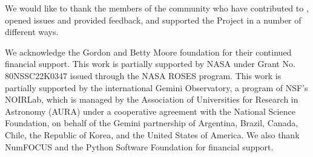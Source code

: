 \documentclass[modern]{aastex631}
\begin{document}
\vspace{2em}

We would like to thank the members of the community who have contributed to
\astropy, opened issues and provided feedback, and supported the
Project in a number of different ways.

We acknowledge the Gordon and Betty Moore foundation for their continued
financial support.
This work is partially supported by NASA under Grant No. 80NSSC22K0347 issued
through the NASA ROSES program.
This work is partially supported by the international Gemini Observatory, a
program of NSF's NOIRLab, which is managed by the Association of Universities
for Research in Astronomy (AURA) under a cooperative agreement with the National
Science Foundation, on behalf of the Gemini partnership of Argentina, Brazil,
Canada, Chile, the Republic of Korea, and the United States of America.
We also thank NumFOCUS and the Python Software Foundation for financial
support.
\end{document}
